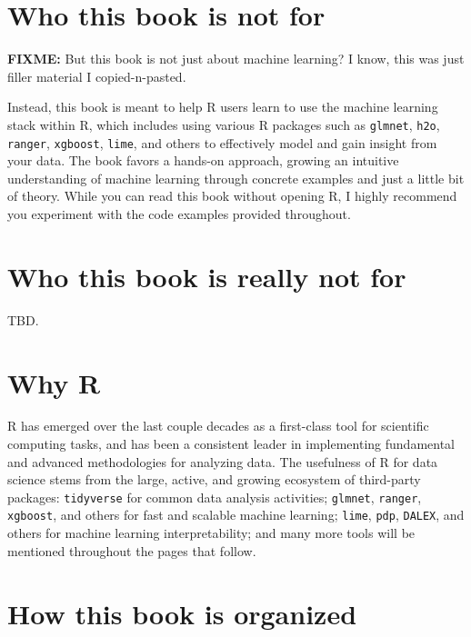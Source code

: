 \documentclass[]{book}
\theoremstyle{definition}
\theoremstyle{definition}
\theoremstyle{definition}
\theoremstyle{remark}
\begin{document}
\hypertarget{who-this-book-is-not-for}{%
\section*{Who this book is not for}\label{who-this-book-is-not-for}}

\textbf{FIXME:} But this book is not just about machine learning? I
know, this was just filler material I copied-n-pasted.

Instead, this book is meant to help R users learn to use the machine
learning stack within R, which includes using various R packages such as
\texttt{glmnet}, \texttt{h2o}, \texttt{ranger}, \texttt{xgboost},
\texttt{lime}, and others to effectively model and gain insight from
your data. The book favors a hands-on approach, growing an intuitive
understanding of machine learning through concrete examples and just a
little bit of theory. While you can read this book without opening R, I
highly recommend you experiment with the code examples provided
throughout.

\hypertarget{who-this-book-is-really-not-for}{%
\section*{Who this book is really not
for}\label{who-this-book-is-really-not-for}}

TBD.

\hypertarget{why-r}{%
\section*{Why R}\label{why-r}}

R has emerged over the last couple decades as a first-class tool for
scientific computing tasks, and has been a consistent leader in
implementing fundamental and advanced methodologies for analyzing data.
The usefulness of R for data science stems from the large, active, and
growing ecosystem of third-party packages: \texttt{tidyverse} for common
data analysis activities; \texttt{glmnet}, \texttt{ranger},
\texttt{xgboost}, and others for fast and scalable machine learning;
\texttt{lime}, \texttt{pdp}, \texttt{DALEX}, and others for machine
learning interpretability; and many more tools will be mentioned
throughout the pages that follow.

\hypertarget{how-this-book-is-organized}{%
\section*{How this book is organized}\label{how-this-book-is-organized}}
\end{document}
